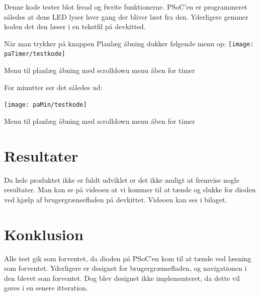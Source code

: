 Denne kode tester blot fread og fwrite funktionerne. PSoC'en er programmeret således at dens LED lyser hver gang der bliver læst fra den. Yderligere gemmer koden det den læser i en tekstfil på devkitted.

Når man trykker på knappen Planlæg åbning dukker følgende menu op:
\texttt{[image: paTimer/testkode]}
\caption{Menu til planlæg åbning med scrolldown menu åben for timer}

For minutter ser det således ud:

\texttt{[image: paMin/testkode]}
\caption{Menu til planlæg åbning med scrolldown menu åben for timer}

\section*{Resultater}

Da hele produktet ikke er fuldt udviklet er det ikke muligt at fremvise nogle resultater. Man kan se på videoen at vi kommer til at tænde og slukke for dioden ved hjælp af brugergrænsefladen på devkittet. Videoen kan ses i bilaget.

\section*{Konklusion}

Alle test gik som forventet, da dioden på PSoC'en kom til at tænde ved læsning som forventet. Yderligere er designet for brugergrænsefladen, og navigationen i den blevet som forventet. Dog blev designet ikke implementeret, da dette vil gøres i en senere itteration.